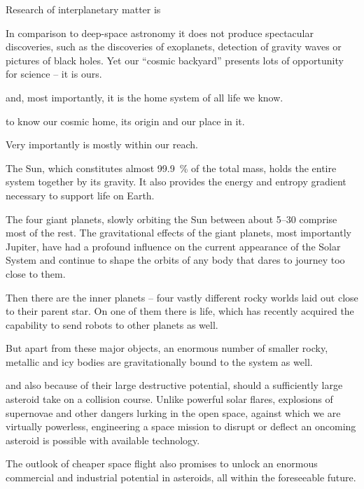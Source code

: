 
Research of interplanetary matter is 

In comparison to deep-space astronomy it does not produce spectacular discoveries,
such as the discoveries of exoplanets, detection of gravity waves or pictures of black holes.
Yet our ``cosmic backyard'' presents lots of opportunity for science -- it is ours.

and, most importantly, it is the home system of all life we know.

to know our cosmic home, its origin and our place in it.

Very importantly is mostly within our reach.

The Sun, which constitutes almost \SI{99.9}{\percent} of the total mass, holds the entire
system together by its gravity. It also provides the energy and entropy gradient necessary
to support life on Earth.

The four giant planets, slowly orbiting the Sun between about \SIrange[range-phrase = {and}]{5}{30}{\au}
comprise most of the rest. The gravitational effects of the giant planets, most importantly Jupiter,
have had a profound influence on the current appearance of the Solar System and continue to
shape the orbits of any body that dares to journey too close to them.

Then there are the inner planets -- four vastly different rocky worlds laid out
close to their parent star. On one of them there is life,
which has recently acquired the capability to send robots to other planets as well.

But apart from these major objects, an enormous number of smaller rocky, metallic and icy
bodies are gravitationally bound to the system as well.

and also because of their large destructive potential, should a sufficiently large asteroid take on a collision course.
Unlike powerful solar flares, explosions of supernovae and other dangers lurking in the open space, against which we are
virtually powerless, engineering a space mission to disrupt or deflect an oncoming asteroid is possible with
available technology.

The outlook of cheaper space flight also promises to unlock an enormous commercial and industrial potential in asteroids,
all within the foreseeable future.

